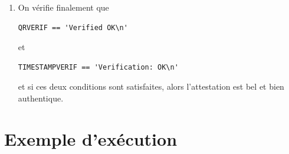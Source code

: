 \documentclass[12pt]{article}
\newcommand{\1}{\mathbbm{1}}
\begin{document}
\begin{enumerate}[label=(\arabic*)]
\begin{lstlisting}
(revers,ignorer)=l.communicate()
TIMESTAMPVERIF=revers.decode()
\end{lstlisting}
\vspace*{7mm}	

\item On vérifie finalement que 
\begin{lstlisting}
QRVERIF == 'Verified OK\n' 
\end{lstlisting}
\vspace*{7mm}
et 
\begin{lstlisting}
TIMESTAMPVERIF == 'Verification: OK\n' 
\end{lstlisting}
\vspace*{7mm}
et si ces deux conditions sont satisfaites, alors l'attestation est bel et bien authentique.

\end{enumerate}




\pagebreak

\section{Exemple d'exécution}
\end{document}
